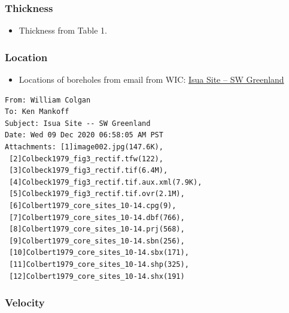 \documentclass[article,a4paper,times,11pt,twoside]{article}
\begin{document}
\subsubsection{Thickness}
\label{sec:org186504e}

\begin{itemize}
\item Thickness from \textcite{colbeck_1979} Table 1.
\end{itemize}

\subsubsection{Location}
\label{sec:orgfea4001}

\begin{itemize}
\item Locations of boreholes from email from WIC: \href{msgid:AM0PR04MB6129F131ECD9123E72752945A2CC0@AM0PR04MB6129.eurprd04.prod.outlook.com}{Isua Site -- SW Greenland}
\end{itemize}

\begin{verbatim}
From: William Colgan
To: Ken Mankoff
Subject: Isua Site -- SW Greenland
Date: Wed 09 Dec 2020 06:58:05 AM PST
Attachments: [1]image002.jpg(147.6K),
 [2]Colbeck1979_fig3_rectif.tfw(122),
 [3]Colbeck1979_fig3_rectif.tif(6.4M),
 [4]Colbeck1979_fig3_rectif.tif.aux.xml(7.9K),
 [5]Colbeck1979_fig3_rectif.tif.ovr(2.1M),
 [6]Colbert1979_core_sites_10-14.cpg(9),
 [7]Colbert1979_core_sites_10-14.dbf(766),
 [8]Colbert1979_core_sites_10-14.prj(568),
 [9]Colbert1979_core_sites_10-14.sbn(256),
 [10]Colbert1979_core_sites_10-14.sbx(171),
 [11]Colbert1979_core_sites_10-14.shp(325),
 [12]Colbert1979_core_sites_10-14.shx(191)
\end{verbatim}

\subsubsection{Velocity}
\label{sec:orgc1610f4}
\clearpage
\end{document}
